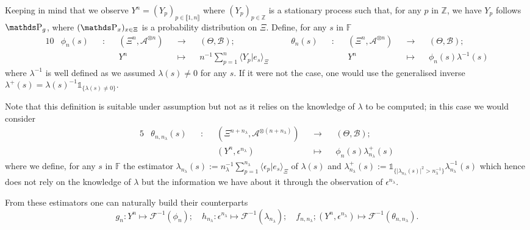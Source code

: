 \begin{de}
Keeping in mind that we observe $Y^{n} = (Y_{p})_{p \in \llbracket 1, n \rrbracket}$ where $(Y_{p})_{p \in \mathds{Z}}$ is a stationary process such that, for any $p$ in $\mathds{Z}$, we have $Y_{p}$ follows $\P_{g}$, where $(\P_{x})_{x \in \Xi}$ is a probability distribution on $\Xi$.
Define, for any $s$ in $\mathds{F}$
\begin{alignat*}{10}
&\phi_{n}(s) && : && (\Xi^{n}, \mathcal{A}^{\otimes n}) && \rightarrow && (\Theta, \mathcal{B}); && \quad \theta_{n}(s) && : && (\Xi^{n}, \mathcal{A}^{\otimes n}) && \rightarrow && (\Theta, \mathcal{B});\\
& && && Y^{n} && \mapsto && n^{-1} \sum\nolimits_{p = 1}^{n} \langle Y_{p} \vert e_{s} \rangle_{\Xi} && \quad && && Y^{n} && \mapsto && \phi_{n}(s) \lambda^{-1}(s)
\end{alignat*}
where $\lambda^{-1}$ is well defined as we assumed $\lambda(s) \neq 0$ for any $s$.
If it were not the case, one would use the generalised inverse $\lambda^{+}(s) = \lambda(s)^{-1} \mathds{1}_{\{\lambda(s) \neq 0\}}$.

Note that this definition is suitable under assumption  but not  as it relies on the knowledge of $\lambda$ to be computed; in this case we would consider
\begin{alignat*}{5}
& \theta_{n, n_{\lambda}}(s) && : && (\Xi^{n + n_{\lambda}}, \mathcal{A}^{\otimes (n + n_{\lambda})}) && \rightarrow && (\Theta, \mathcal{B});\\
& && && (Y^{n}, \epsilon^{n_{\lambda}}) && \mapsto && \phi_{n}(s) \lambda_{n_{\lambda}}^{+}(s)
\end{alignat*}
where we define, for any $s$ in $\mathds{F}$ the estimator $\lambda_{n_{\lambda}}(s) := n_{\lambda}^{-1} \sum_{p = 1}^{n_{\lambda}} \langle \epsilon_{p} \vert e_{s} \rangle_{\Xi}$ of $\lambda(s)$ and $\lambda_{n_{\lambda}}^{+}(s) := \mathds{1}_{\{\vert \lambda_{n_{\lambda}}(s) \vert^{2} > n_{\lambda}^{-1} \}} \lambda_{n_{\lambda}}^{-1}(s)$ which hence does not rely on the knowledge of $\lambda$ but the information we have about it through the observation of $\epsilon^{n_{\lambda}}$.

From these estimators one can naturally build their counterparts
\[g_{n}: Y^{n} \mapsto \mathcal{F}^{-1}(\phi_{n}) ; \quad h_{n_{\lambda}}: \epsilon^{n_{\lambda}} \mapsto \mathcal{F}^{-1}(\lambda_{n_{\lambda}}); \quad f_{n, n_{\lambda}}; (Y^{n}, \epsilon^{n_{\lambda}}) \mapsto \mathcal{F}^{-1}(\theta_{n, n_{\lambda}}).\]
\assEnd
\end{de}

